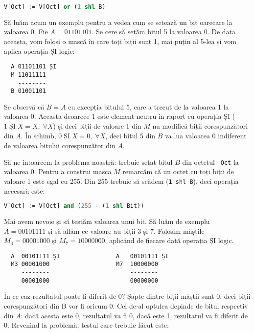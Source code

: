 \begin{lstlisting}[language=Pascal]
V[Oct] := V[Oct] or (1 shl B)
\end{lstlisting}

Să luăm acum un exemplu pentru a vedea cum se setează un bit oarecare la
valoarea 0. Fie $A = 01101101$. Se cere să setăm bitul 5 la valoarea 0. De
data aceasta, vom folosi o mască în care toți biții sunt 1, mai puțin al 5-lea
și vom aplica operația ȘI logic:

\begin{verbatim}
  A 01101101 ȘI
  M 11011111
    --------
  B 01001101
\end{verbatim}

Se observă că $B = A$ cu excepția bitului 5, care a trecut de la valoarea 1 la
valoarea 0. Aceasta deoarece 1 este element neutru în raport cu operația ȘI
($1\; \mathrm{\text{ȘI}}\; X = X,\; \forall X$) și deci biții de valoare 1 din
$M$ nu modifică biții corespunzători din $A$. În schimb, $0\;
\mathrm{\text{ȘI}}\; X = 0,\; \forall X$, deci bitul 5 din $B$ va lua valoarea
0 indiferent de valoarea bitului corespunzător din $A$.

Să ne întoarcem la problema noastră: trebuie setat bitul $B$ din octetul {\tt
  Oct} la valoarea 0. Pentru a construi masca $M$ remarcăm că un octet cu toți
biții de valoare 1 este egal cu 255. Din 255 trebuie să scădem ({\tt 1 shl
  B}), deci operația necesară este:

\begin{lstlisting}[language=Pascal]
V[Oct] := V[Oct] and (255 - (1 shl Bit))
\end{lstlisting}

Mai avem nevoie și să testăm valoarea unui bit. Să luăm de exemplu $A =
00101111$ și să aflăm ce valoare au biții 3 și 7. Folosim măștile $M_3 =
00001000$ și $M_7 = 10000000$, aplicând de fiecare dată operația ȘI logic.

\begin{verbatim}
  A  00101111 ȘI                A   00101111 ȘI
  M3 00001000                   M7  10000000
     --------                       --------
     00001000                       00000000  
\end{verbatim}

În ce caz rezultatul poate fi diferit de 0? Șapte dintre biții măștii sunt 0,
deci biții corespunzători din B vor fi oricum 0. Cel de-al optulea depinde de
bitul respectiv din $A$: dacă acesta este 0, rezultatul va fi 0, dacă este 1,
rezultatul va fi diferit de 0. Revenind la problemă, testul care trebuie făcut
este:

